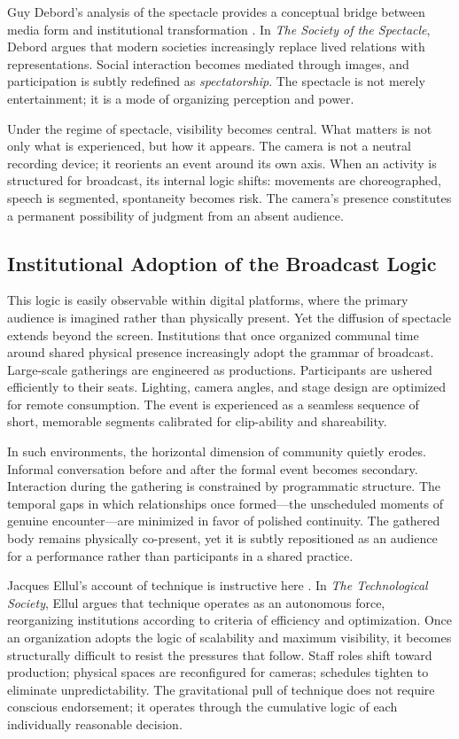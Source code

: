 \documentclass[11pt]{article}
\begin{document}
Guy Debord's analysis of the spectacle provides a conceptual bridge between media form and institutional transformation \citep{Debord1994}. In \emph{The Society of the Spectacle}, Debord argues that modern societies increasingly replace lived relations with representations. Social interaction becomes mediated through images, and participation is subtly redefined as \emph{spectatorship}. The spectacle is not merely entertainment; it is a mode of organizing perception and power.

Under the regime of spectacle, visibility becomes central. What matters is not only what is experienced, but how it appears. The camera is not a neutral recording device; it reorients an event around its own axis. When an activity is structured for broadcast, its internal logic shifts: movements are choreographed, speech is segmented, spontaneity becomes risk. The camera's presence constitutes a permanent possibility of judgment from an absent audience.

\subsection{Institutional Adoption of the Broadcast Logic}

This logic is easily observable within digital platforms, where the primary audience is imagined rather than physically present. Yet the diffusion of spectacle extends beyond the screen. Institutions that once organized communal time around shared physical presence increasingly adopt the grammar of broadcast. Large-scale gatherings are engineered as productions. Participants are ushered efficiently to their seats. Lighting, camera angles, and stage design are optimized for remote consumption. The event is experienced as a seamless sequence of short, memorable segments calibrated for clip-ability and shareability.

In such environments, the horizontal dimension of community quietly erodes. Informal conversation before and after the formal event becomes secondary. Interaction during the gathering is constrained by programmatic structure. The temporal gaps in which relationships once formed---the unscheduled moments of genuine encounter---are minimized in favor of polished continuity. The gathered body remains physically co-present, yet it is subtly repositioned as an audience for a performance rather than participants in a shared practice.

Jacques Ellul's account of technique is instructive here \citep{Ellul1964}. In \emph{The Technological Society}, Ellul argues that technique operates as an autonomous force, reorganizing institutions according to criteria of efficiency and optimization. Once an organization adopts the logic of scalability and maximum visibility, it becomes structurally difficult to resist the pressures that follow. Staff roles shift toward production; physical spaces are reconfigured for cameras; schedules tighten to eliminate unpredictability. The gravitational pull of technique does not require conscious endorsement; it operates through the cumulative logic of each individually reasonable decision.
\end{document}
